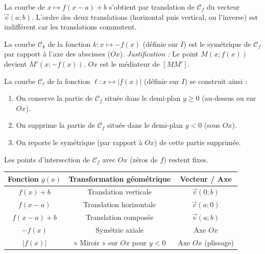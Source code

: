 \documentclass[11pt]{article}
\begin{document}
\begin{propriete}
La courbe de $x \mapsto f(x-a)+b$ s'obtient par translation de $\mathcal{C}_f$ du vecteur $\vec{v}(a;b)$. L'ordre des deux translations (horizontal puis vertical, ou l'inverse) est indifférent car les translations commutent.
\end{propriete}

\begin{propriete}
La courbe $\mathcal{C}_{k}$ de la fonction $k : x \mapsto -f(x)$ (définie sur $I$) est le symétrique de $\mathcal{C}_f$ par rapport à l'axe des abscisses ($Ox$).
\emph{Justification :} Le point $M(x;f(x))$ devient $M'(x;-f(x))$. $Ox$ est le médiateur de $[MM']$.
\end{propriete}

\begin{propriete}
La courbe $\mathcal{C}_{\ell}$ de la fonction $\ell : x \mapsto |f(x)|$ (définie sur $I$) se construit ainsi :
\begin{enumerate}
    \item On conserve la partie de $\mathcal{C}_f$ située dans le demi-plan $y \ge 0$ (au-dessus ou sur $Ox$).
    \item On supprime la partie de $\mathcal{C}_f$ située dans le demi-plan $y < 0$ (sous $Ox$).
    \item On reporte le symétrique (par rapport à $Ox$) de cette partie supprimée.
\end{enumerate}
Les points d'intersection de $\mathcal{C}_f$ avec $Ox$ (zéros de $f$) restent fixes.
\end{propriete}

\begin{aretenir}
\begin{center}
\begin{tabular}{|c|c|c|}\hline
\textbf{Fonction $g(x)$} & \textbf{Transformation géométrique} & \textbf{Vecteur / Axe} \\ \hline
$f(x) + b$ & Translation verticale & $\vec{v}(0;b)$ \\ \hline
$f(x-a)$ & Translation horizontale & $\vec{v}(a;0)$ \\ \hline
$f(x-a)+b$ & Translation composée & $\vec{v}(a;b)$ \\ \hline
$-f(x)$ & Symétrie axiale & Axe $Ox$ \\ \hline
$|f(x)|$ & « Miroir » sur $Ox$ pour $y<0$ & Axe $Ox$ (plissage) \\ \hline
\end{tabular}
\end{center}
\end{aretenir}
\end{document}
